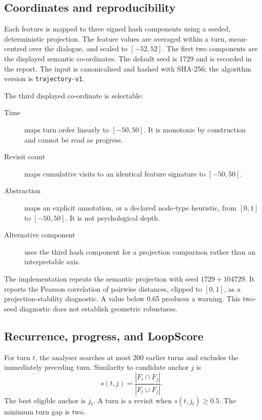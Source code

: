 \documentclass[11pt]{article}
\newcommand{\code}[1]{\texttt{#1}}
\begin{document}
\subsection{Coordinates and reproducibility}

Each feature is mapped to three signed hash components using a seeded,
deterministic projection. The feature values are averaged within a turn,
mean-centred over the dialogue, and scaled to $[-52,52]$. The first two
components are the displayed semantic co-ordinates. The default seed is 1729
and is recorded in the report. The input is canonicalised and hashed with
SHA-256; the algorithm version is \code{trajectory-v1}.

The third displayed co-ordinate is selectable:

\begin{description}
  \item[Time] maps turn order linearly to $[-50,50]$. It is monotonic by
        construction and cannot be read as progress.
  \item[Revisit count] maps cumulative visits to an identical feature
        signature to $[-50,50]$.
  \item[Abstraction] maps an explicit annotation, or a declared node-type
        heuristic, from $[0,1]$ to $[-50,50]$. It is not psychological depth.
  \item[Alternative component] uses the third hash component for a projection
        comparison rather than an interpretable axis.
\end{description}

The implementation repeats the semantic projection with seed $1729+104729$.
It reports the Pearson correlation of pairwise distances, clipped to $[0,1]$,
as a projection-stability diagnostic. A value below 0.65 produces a warning.
This two-seed diagnostic does not establish geometric robustness.

\subsection{Recurrence, progress, and LoopScore}

For turn $t$, the analyser searches at most 200 earlier turns and excludes the
immediately preceding turn. Similarity to candidate anchor $j$ is
\begin{equation}
s(t,j)=\frac{|F_t\cap F_j|}{|F_t\cup F_j|}.
\end{equation}
The best eligible anchor is $j_t$. A turn is a revisit when
$s(t,j_t)\geq0.5$. The minimum turn gap is two.
\end{document}
